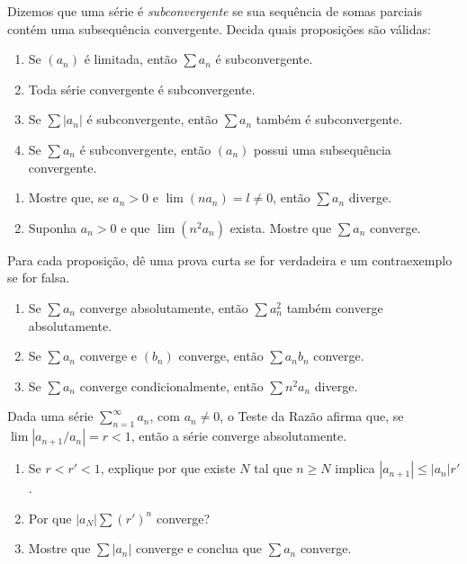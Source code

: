 \begin{exercise}\label{ex:2-7-6}
Dizemos que uma série é \textit{subconvergente} se sua sequência de somas parciais contém uma subsequência convergente. Decida quais proposições são válidas:
\begin{enumerate}[label=\alph*)]
\item Se $(a_n)$ é limitada, então $\sum a_n$ é subconvergente.
\item Toda série convergente é subconvergente.
\item Se $\sum|a_n|$ é subconvergente, então $\sum a_n$ também é subconvergente.
\item Se $\sum a_n$ é subconvergente, então $(a_n)$ possui uma subsequência convergente.
\end{enumerate}
\end{exercise}

\begin{exercise}\label{ex:2-7-7}
\begin{enumerate}[label=\alph*)]
\item Mostre que, se $a_n>0$ e $\lim(na_n)=l\neq0$, então $\sum a_n$ diverge.
\item Suponha $a_n>0$ e que $\lim(n^2a_n)$ exista. Mostre que $\sum a_n$ converge.
\end{enumerate}
\end{exercise}

\begin{exercise}\label{ex:2-7-8}
Para cada proposição, dê uma prova curta se for verdadeira e um contraexemplo se for falsa.
\begin{enumerate}[label=\alph*)]
\item Se $\sum a_n$ converge absolutamente, então $\sum a_n^2$ também converge absolutamente.
\item Se $\sum a_n$ converge e $(b_n)$ converge, então $\sum a_nb_n$ converge.
\item Se $\sum a_n$ converge condicionalmente, então $\sum n^2a_n$ diverge.
\end{enumerate}
\end{exercise}

\begin{exercise}\label{ex:2-7-9}
Dada uma série $\sum_{n=1}^{\infty}a_n$, com $a_n\neq0$, o Teste da Razão afirma que, se $\lim|a_{n+1}/a_n|=r<1$, então a série converge absolutamente.
\begin{enumerate}[label=\alph*)]
\item Se $r<r'<1$, explique por que existe $N$ tal que $n\geq N$ implica $|a_{n+1}|\leq|a_n|r'$.
\item Por que $|a_N|\sum(r')^n$ converge?
\item Mostre que $\sum|a_n|$ converge e conclua que $\sum a_n$ converge.
\end{enumerate}
\end{exercise}

